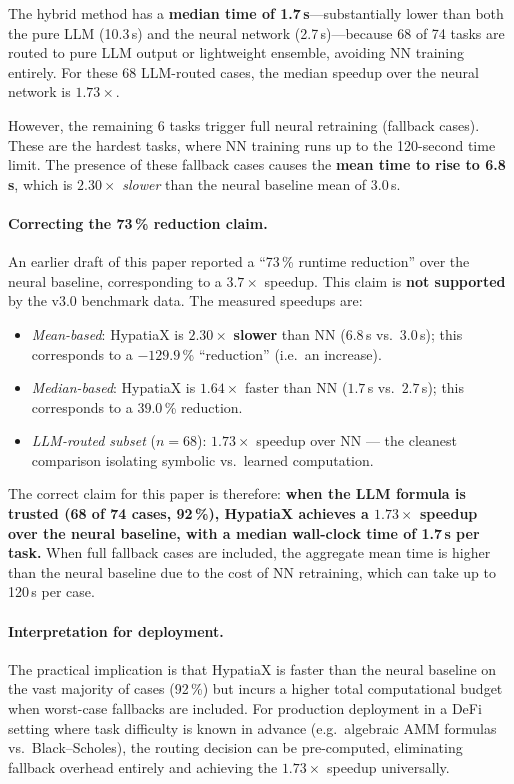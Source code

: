 \documentclass[twoside,11pt]{article}
\begin{document}
The hybrid method has a \textbf{median time of 1.7\,s}---substantially lower than
both the pure LLM (10.3\,s) and the neural network (2.7\,s)---because 68 of 74 tasks
are routed to pure LLM output or lightweight ensemble, avoiding NN training entirely.
For these 68 LLM-routed cases, the median speedup over the neural network is
$\mathbf{1.73\times}$.

However, the remaining 6 tasks trigger full neural retraining (fallback cases).
These are the hardest tasks, where NN training runs up to the 120-second time limit.
The presence of these fallback cases causes the \textbf{mean time to rise to 6.8\,s},
which is $2.30\times$ \emph{slower} than the neural baseline mean of 3.0\,s.

\paragraph{Correcting the 73\,\% reduction claim.}
\label{sec:correction}

An earlier draft of this paper reported a ``73\,\% runtime reduction'' over the
neural baseline, corresponding to a $3.7\times$ speedup.  This claim
is \textbf{not supported} by the v3.0 benchmark data.  The measured speedups are:
\begin{itemize}
  \item \emph{Mean-based}: HypatiaX is $2.30\times$ \textbf{slower} than NN
    ($6.8$\,s vs.\ $3.0$\,s); this corresponds to a $-129.9$\,\% ``reduction'' (i.e.\ an increase).
  \item \emph{Median-based}: HypatiaX is $1.64\times$ faster than NN
    ($1.7$\,s vs.\ $2.7$\,s); this corresponds to a $39.0$\,\% reduction.
  \item \emph{LLM-routed subset} ($n=68$): $1.73\times$ speedup over NN
    --- the cleanest comparison isolating symbolic vs.\ learned computation.
\end{itemize}

The correct claim for this paper is therefore: \textbf{when the LLM formula is
trusted (68 of 74 cases, 92\,\%), HypatiaX achieves a $1.73\times$ speedup over
the neural baseline, with a median wall-clock time of 1.7\,s per task.}  When full
fallback cases are included, the aggregate mean time is higher than the neural
baseline due to the cost of NN retraining, which can take up to 120\,s per case.

\paragraph{Interpretation for deployment.}
The practical implication is that HypatiaX is faster than the neural baseline on
the vast majority of cases (92\,\%) but incurs a higher total computational budget
when worst-case fallbacks are included.  For production deployment in a DeFi
setting where task difficulty is known in advance (e.g.\ algebraic AMM formulas
vs.\ Black--Scholes), the routing decision can be pre-computed, eliminating fallback
overhead entirely and achieving the $1.73\times$ speedup universally.
\end{document}
